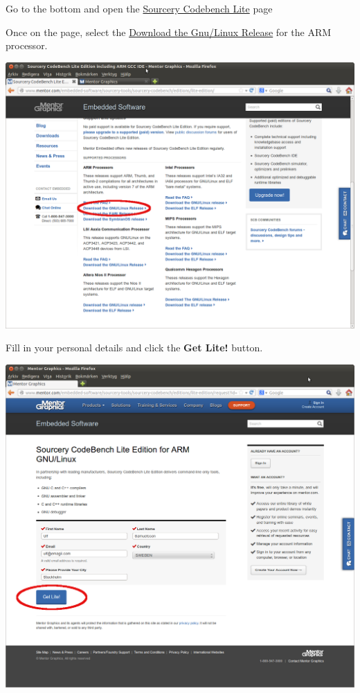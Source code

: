 Go to the bottom and open the \href{http://www.mentor.com/embedded-software/sourcery-tools/sourcery-codebench/editions/lite-edition.html}{Sourcery Codebench Lite} page
\clearpage

Once on the page, select the \href{http://www.mentor.com/embedded-software/sourcery-tools/sourcery-codebench/editions/lite-edition/arm-gnu-linux.html}{Download the Gnu/Linux Release} for the ARM processor.
\\

\begin{center}
  \includegraphics[width=\textwidth]{labs/setup-codesourcery/Gnu_Linux.png}
\end{center}
\clearpage

Fill in your personal details and click the {\bf Get Lite!} button.
\\

\begin{center}
  \includegraphics[width=\textwidth]{labs/setup-codesourcery/Mentor_User_Info.png}
\end{center}

